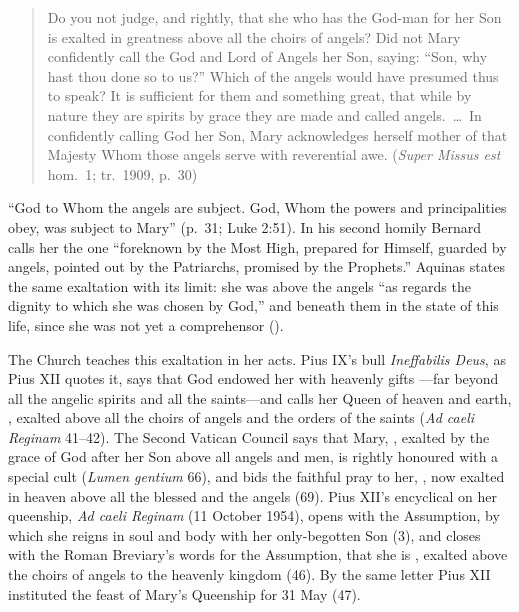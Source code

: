 \begin{quote}
Do you not judge, and rightly, that she who has the God-man for her Son is
exalted in greatness above all the choirs of angels? Did not Mary
confidently call the God and Lord of Angels her Son, saying: ``Son, why
hast thou done so to us?'' Which of the angels would have presumed thus to
speak? It is sufficient for them and something great, that while by nature
they are spirits by grace they are made and called angels.~\dots\ In
confidently calling God her Son, Mary acknowledges herself mother of that
Majesty Whom those angels serve with reverential awe. (\emph{Super Missus
est} hom.~1; tr.\ 1909, p.~30)
\end{quote}

\noindent ``God to Whom the angels are subject. God, Whom the powers and
principalities obey, was subject to Mary'' (p.~31; Luke 2:51). In his second
homily Bernard calls her the one ``foreknown by the Most High, prepared for
Himself, guarded by angels, pointed out by the Patriarchs, promised by the
Prophets.'' Aquinas states the same exaltation with its limit: she was above
the angels ``as regards the dignity to which she was chosen by God,'' and
beneath them in the state of this life, since she was not yet a
comprehensor ().

The Church teaches this exaltation in her acts. Pius IX's bull
\emph{Ineffabilis Deus}, as Pius XII quotes it, says that God endowed
her with heavenly gifts ---far beyond all the angelic spirits and all the saints---and calls
her Queen of heaven and earth, , exalted above all the choirs of
angels and the orders of the saints (\emph{Ad caeli Reginam} 41--42). The
Second Vatican Council says that Mary, , exalted by the grace of God
after her Son above all angels and men, is rightly honoured with a special
cult (\emph{Lumen gentium} 66), and bids the faithful pray to her, , now exalted in
heaven above all the blessed and the angels (69). Pius XII's encyclical on
her queenship, \emph{Ad caeli Reginam} (11 October 1954), opens with the
Assumption, by which she reigns in soul and body  with her only-begotten Son (3), and closes
with the Roman Breviary's words for the Assumption, that she is
, exalted above the
choirs of angels to the heavenly kingdom (46). By the same letter Pius XII
instituted the feast of Mary's Queenship for 31 May (47).

